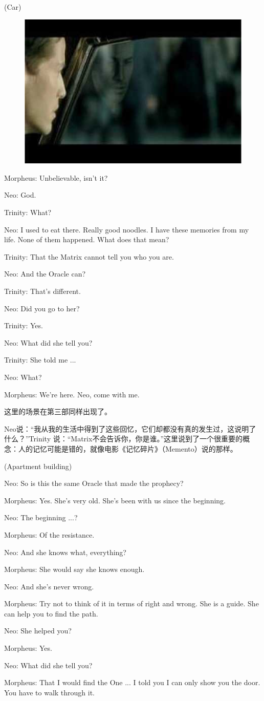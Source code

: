 \documentclass{ctexart}
\newenvironment{myquote}{\color{green} \setlength{\leftskip}{6em} \setlength{\rightskip}{4em} \setlength{\parindent}{-2em}}{\par}
\begin{document}
\begin{myquote}
(Car)

\begin{figure}[htb]
\centering
\includegraphics[width=0.5\linewidth]{fig/read_Matrix-42}
\end{figure}

Morpheus: Unbelievable, isn't it?

Neo: God.

Trinity: What?

Neo: I used to eat there. Really good noodles. I have these memories from my life. None of them happened. What does that mean?

Trinity: That the Matrix cannot tell you who you are.

Neo: And the Oracle can?

Trinity: That's different.

Neo: Did you go to her?

Trinity: Yes.

Neo: What did she tell you?

Trinity: She told me ...

Neo: What?

Morpheus: We're here. Neo, come with me.
\end{myquote}

这里的场景在第三部同样出现了。

Neo说：“我从我的生活中得到了这些回忆，它们却都没有真的发生过，这说明了什么？”Trinity 说：“Matrix不会告诉你，你是谁。”这里说到了一个很重要的概念：人的记忆可能是错的，就像电影《记忆碎片》（Memento）说的那样。

\begin{myquote}
(Apartment building)

Neo: So is this the same Oracle that made the prophecy?

Morpheus: Yes. She's very old. She's been with us since the beginning.

Neo: The beginning ...?

Morpheus: Of the resistance.

Neo: And she knows what, everything?

Morpheus: She would say she knows enough.

Neo: And she's never wrong.

Morpheus: Try not to think of it in terms of right and wrong. She is a guide. She can help you to find the path.

Neo: She helped you?

Morpheus: Yes.

Neo: What did she tell you?

Morpheus: That I would find the One ... I told you I can only show you the door. You have to walk through it.
\end{myquote}
\end{document}
